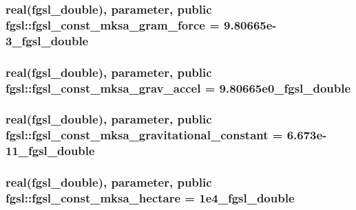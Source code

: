 \subsubsection[{fgsl\+\_\+const\+\_\+mksa\+\_\+gram\+\_\+force}]{\setlength{\rightskip}{0pt plus 5cm}real({\bf fgsl\+\_\+double}), parameter, public fgsl\+::fgsl\+\_\+const\+\_\+mksa\+\_\+gram\+\_\+force = 9.\+80665e-\/3\+\_\+fgsl\+\_\+double}\label{namespacefgsl_ac3e7e21c6fe9874df8a9b7583e343e76}
\hypertarget{namespacefgsl_a7c644841a5ff5cd815dca7cfc3383642}{}
\subsubsection[{fgsl\+\_\+const\+\_\+mksa\+\_\+grav\+\_\+accel}]{\setlength{\rightskip}{0pt plus 5cm}real({\bf fgsl\+\_\+double}), parameter, public fgsl\+::fgsl\+\_\+const\+\_\+mksa\+\_\+grav\+\_\+accel = 9.\+80665e0\+\_\+fgsl\+\_\+double}\label{namespacefgsl_a7c644841a5ff5cd815dca7cfc3383642}
\hypertarget{namespacefgsl_a74c4f68c51be744dc16f9de6679690a1}{}
\subsubsection[{fgsl\+\_\+const\+\_\+mksa\+\_\+gravitational\+\_\+constant}]{\setlength{\rightskip}{0pt plus 5cm}real({\bf fgsl\+\_\+double}), parameter, public fgsl\+::fgsl\+\_\+const\+\_\+mksa\+\_\+gravitational\+\_\+constant = 6.\+673e-\/11\+\_\+fgsl\+\_\+double}\label{namespacefgsl_a74c4f68c51be744dc16f9de6679690a1}
\hypertarget{namespacefgsl_a62efb1288447e01349bbf38c21b82e70}{}
\subsubsection[{fgsl\+\_\+const\+\_\+mksa\+\_\+hectare}]{\setlength{\rightskip}{0pt plus 5cm}real({\bf fgsl\+\_\+double}), parameter, public fgsl\+::fgsl\+\_\+const\+\_\+mksa\+\_\+hectare = 1e4\+\_\+fgsl\+\_\+double}\label{namespacefgsl_a62efb1288447e01349bbf38c21b82e70}
\hypertarget{namespacefgsl_af97c5cddea274909ba83c36dc36e90a3}{}
